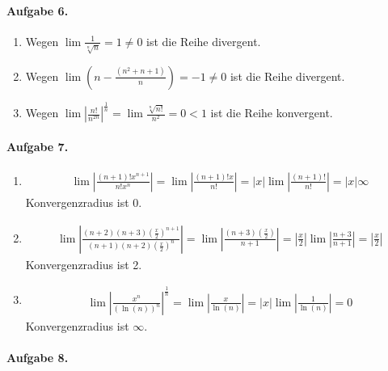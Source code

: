 \documentclass{article}
\begin{document}
\paragraph{Aufgabe 6.}

\begin{enumerate}
    \item Wegen $\lim \frac{1}{\sqrt[n]{n}} = 1 \neq 0$ ist die Reihe divergent.
    
    \item Wegen $\lim \left(n-\frac{\left(n^2+n+1\right)}{n}\right) = -1 \neq 0$ ist die Reihe divergent.
    
    \item Wegen $\lim |\frac{n!}{n^{2n}}|^{\frac{1}{n}} = \lim \frac{\sqrt[n]{n!}}{n^2} = 0 < 1$ ist die Reihe konvergent.
\end{enumerate}

\paragraph{Aufgabe 7.}

\begin{enumerate}
    \item \begin{align*}
        \lim \left|\frac{(n+1)!x^{n+1}}{n!x^n}\right| = \lim \left|\frac{(n+1)!x}{n!}\right| = |x| \lim \left|\frac{(n+1)!}{n!}\right| = |x| \infty
    \end{align*}
    Konvergenzradius ist 0.

    \item \begin{align*}
        \lim \left|\frac{(n + 2)(n + 3)\left(\frac{x}{2}\right)^{n + 1}}{(n + 1)(n + 2)\left(\frac{x}{2}\right)^{n}}\right| = \lim \left|\frac{(n + 3)\left(\frac{x}{2}\right)}{n + 1}\right| = \left|\frac{x}{2}\right|\lim\left|\frac{n + 3}{n + 1}\right| = \left|\frac{x}{2}\right|
    \end{align*}
    Konvergenzradius ist 2.

    \item \begin{align*}
        \lim \left|\frac{x^n}{(\ln(n))^n}\right|^{\frac{1}{n}} = \lim \left|\frac{x}{\ln(n)}\right| = |x|\lim \left|\frac{1}{\ln(n)}\right| = 0
    \end{align*}
    Konvergenzradius ist $\infty$.
\end{enumerate}

\paragraph{Aufgabe 8.}
\end{document}
